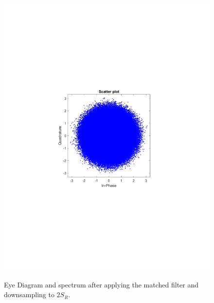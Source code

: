 \begin{refsection}
\begin{figure}[H]
\begin{minipage}{0.30\textwidth}
		\includegraphics[clip, trim=4cm 8cm 4cm 8cm, width=1\textwidth]{./sdf/m_qam_system/figures/expResults/intradyne/2_const_16GBdInSig13dB_AfMF.pdf}
		\label{fig:16GBdSpecBefFec}
	\end{minipage}
	\caption{Eye Diagram and spectrum after applying the matched filter and downsampling to $2 S_R$.}
	\label{fig:4GBMF}
\end{figure}


\end{refsection}
